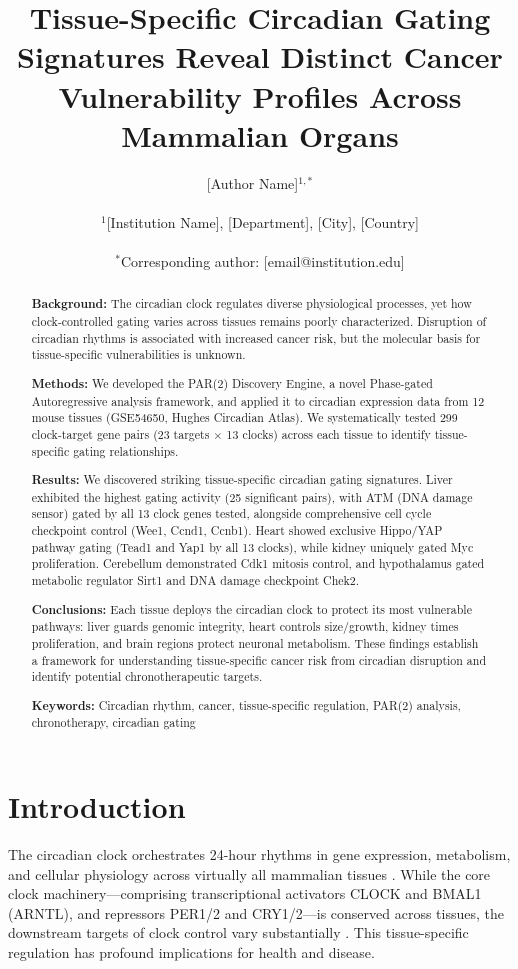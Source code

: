 \documentclass[10pt,letterpaper]{article}
\title{\textbf{Tissue-Specific Circadian Gating Signatures Reveal Distinct Cancer Vulnerability Profiles Across Mammalian Organs}}
\author{
[Author Name]$^{1,*}$ \\
\\
$^1$[Institution Name], [Department], [City], [Country] \\
\\
$^*$Corresponding author: [email@institution.edu]
}
\date{}
\begin{document}
\maketitle

\begin{abstract}
\textbf{Background:} The circadian clock regulates diverse physiological processes, yet how clock-controlled gating varies across tissues remains poorly characterized. Disruption of circadian rhythms is associated with increased cancer risk, but the molecular basis for tissue-specific vulnerabilities is unknown.

\textbf{Methods:} We developed the PAR(2) Discovery Engine, a novel Phase-gated Autoregressive analysis framework, and applied it to circadian expression data from 12 mouse tissues (GSE54650, Hughes Circadian Atlas). We systematically tested 299 clock-target gene pairs (23 targets $\times$ 13 clocks) across each tissue to identify tissue-specific gating relationships.

\textbf{Results:} We discovered striking tissue-specific circadian gating signatures. Liver exhibited the highest gating activity (25 significant pairs), with ATM (DNA damage sensor) gated by all 13 clock genes tested, alongside comprehensive cell cycle checkpoint control (Wee1, Ccnd1, Ccnb1). Heart showed exclusive Hippo/YAP pathway gating (Tead1 and Yap1 by all 13 clocks), while kidney uniquely gated Myc proliferation. Cerebellum demonstrated Cdk1 mitosis control, and hypothalamus gated metabolic regulator Sirt1 and DNA damage checkpoint Chek2.

\textbf{Conclusions:} Each tissue deploys the circadian clock to protect its most vulnerable pathways: liver guards genomic integrity, heart controls size/growth, kidney times proliferation, and brain regions protect neuronal metabolism. These findings establish a framework for understanding tissue-specific cancer risk from circadian disruption and identify potential chronotherapeutic targets.

\textbf{Keywords:} Circadian rhythm, cancer, tissue-specific regulation, PAR(2) analysis, chronotherapy, circadian gating
\end{abstract}

\newpage

\section{Introduction}

The circadian clock orchestrates 24-hour rhythms in gene expression, metabolism, and cellular physiology across virtually all mammalian tissues \citep{takahashi2017}. While the core clock machinery—comprising transcriptional activators CLOCK and BMAL1 (ARNTL), and repressors PER1/2 and CRY1/2—is conserved across tissues, the downstream targets of clock control vary substantially \citep{zhang2014}. This tissue-specific regulation has profound implications for health and disease.
\end{document}
